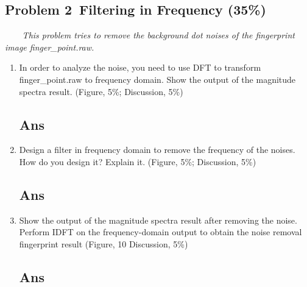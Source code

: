 	\begin{reportsection}{-1cm}{-1cm}
		\section*{Problem 2~Filtering in Frequency (35\%)}
		\textit{~~~~This problem tries to remove the background dot noises of the fingerprint image
				finger\_point.raw.}
		\begin{enumerate}[label=\alph*.]
			\item 
				In order to analyze the noise, you need to use DFT to transform finger\_point.raw to frequency
				domain. Show the output of the magnitude spectra result. (Figure, 5\%; Discussion, 5\%)
				\subsection*{Ans}

			\item 
				Design a filter in frequency domain to remove the frequency of the noises. How do you design
				it? Explain it. (Figure, 5\%; Discussion, 5\%)
				\subsection*{Ans}

			\item
				Show the output of the magnitude spectra result after removing the noise. Perform IDFT on
				the frequency-domain output to obtain the noise removal fingerprint result (Figure, 10%
				Discussion, 5\%)
				\subsection*{Ans}

		\end{enumerate}
	\end{reportsection}

